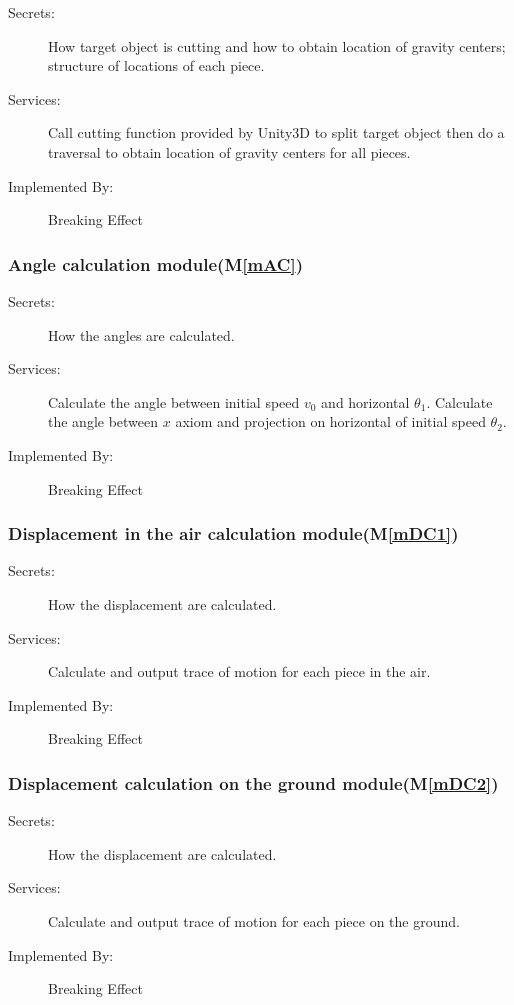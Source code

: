 \documentclass[12pt, titlepage]{article}
\newcommand{\mref}[1]{M\ref{#1}}
\begin{document}
	\begin{description}
		\item[Secrets:]How target object is cutting and how to obtain location of gravity centers; structure of locations of each piece.
		\item[Services:]Call cutting function provided by Unity3D to split target object then do a traversal to obtain location of gravity centers for all pieces.
		\item[Implemented By:] Breaking Effect
	\end{description}
	
	\subsubsection{Angle calculation module(\mref{mAC})}
	
	\begin{description}
		\item[Secrets:]How the angles are calculated.
		\item[Services:]Calculate the angle between initial speed $v_{0}$ and horizontal $\theta_{1}$. Calculate the angle between $x$ axiom and projection on horizontal of initial speed $\theta_{2}$.
		\item[Implemented By:] Breaking Effect
	\end{description}

	\subsubsection{Displacement in the air calculation module(\mref{mDC1})}
	
	\begin{description}
		\item[Secrets:]How the displacement are calculated.
		\item[Services:]Calculate and output trace of motion for each piece in the air.
		\item[Implemented By:] Breaking Effect
	\end{description}
	
	\subsubsection{Displacement calculation on the ground module(\mref{mDC2})}
	
	\begin{description}
		\item[Secrets:]How the displacement are calculated. 
		\item[Services:]Calculate and output trace of motion for each piece on the ground.
		\item[Implemented By:] Breaking Effect
	\end{description}
	
\end{document}

